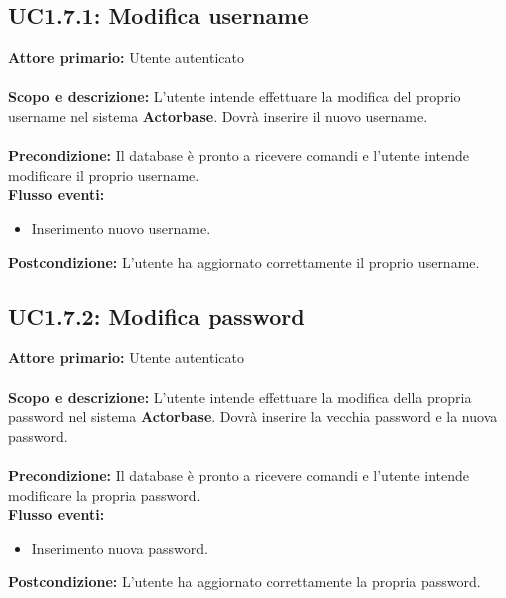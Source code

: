\documentclass{scalatekids-article}
\begin{document}
\subsection{UC1.7.1: Modifica username}
\textbf{Attore primario:} Utente autenticato\\ \\
\textbf{Scopo e descrizione:} L'utente intende effettuare la modifica del proprio username nel sistema \textbf{Actorbase}. Dovrà inserire il nuovo username.\\ \\
\textbf{Precondizione:} Il database è pronto a ricevere comandi e l'utente intende modificare il proprio username.\\
\textbf{Flusso eventi:}
\begin{itemize}
\item Inserimento nuovo username.
\end{itemize}
\textbf{Postcondizione:} L'utente ha aggiornato correttamente il proprio username.
\subsection{UC1.7.2: Modifica password}
\textbf{Attore primario:} Utente autenticato\\ \\
\textbf{Scopo e descrizione:} L'utente intende effettuare la modifica della propria password nel sistema \textbf{Actorbase}. Dovrà inserire la vecchia password e la nuova password.\\ \\
\textbf{Precondizione:} Il database è pronto a ricevere comandi e l'utente intende modificare la propria password.\\
\textbf{Flusso eventi:}
\begin{itemize}
\item Inserimento nuova password.
\end{itemize}
\textbf{Postcondizione:} L'utente ha aggiornato correttamente la propria password.
\end{document}
